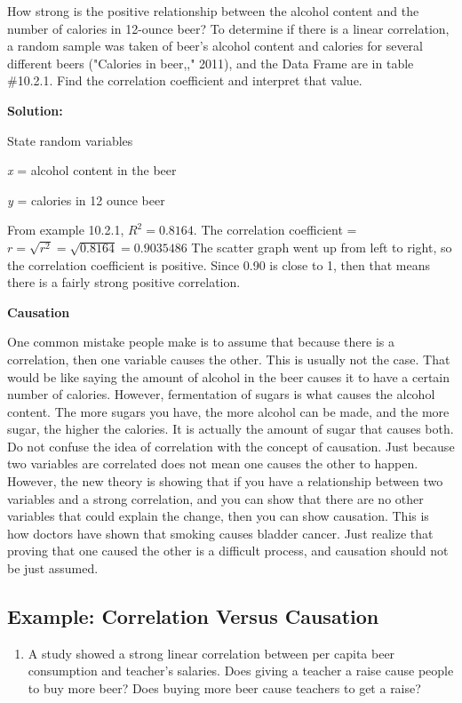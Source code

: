 \documentclass[]{book}
\providecommand{\tightlist}{%
  \setlength{\itemsep}{0pt}\setlength{\parskip}{0pt}}
\begin{document}
How strong is the positive relationship between the alcohol content and the number of calories in 12-ounce beer? To determine if there is a linear correlation, a random sample was taken of beer's alcohol content and calories for several different beers ("Calories in beer,," 2011), and the Data Frame are in table \#10.2.1. Find the correlation coefficient and interpret that value.

\textbf{Solution:}

State random variables

\emph{x} = alcohol content in the beer

\emph{y} = calories in 12 ounce beer

From example 10.2.1, \(R^2=0.8164\). The correlation coefficient = \(r=\sqrt{r^2}=\sqrt{0.8164}=0.9035486\) The scatter graph went up from left to right, so the correlation coefficient is positive. Since 0.90 is close to 1, then that means there is a fairly strong positive correlation.

\textbf{Causation}

One common mistake people make is to assume that because there is a correlation, then one variable causes the other. This is usually not the case. That would be like saying the amount of alcohol in the beer causes it to have a certain number of calories. However, fermentation of sugars is what causes the alcohol content. The more sugars you have, the more alcohol can be made, and the more sugar, the higher the calories. It is actually the amount of sugar that causes both. Do not confuse the idea of correlation with the concept of causation. Just because two variables are correlated does not mean one causes the other to happen. However, the new theory is showing that if you have a relationship between two variables and a strong correlation, and you can show that there are no other variables that could explain the change, then you can show causation. This is how doctors have shown that smoking causes bladder cancer. Just realize that proving that one caused the other is a difficult process, and causation should not be just assumed.

\hypertarget{example-correlation-versus-causation}{%
\subsection{Example: Correlation Versus Causation}\label{example-correlation-versus-causation}}

\begin{enumerate}
\def\labelenumi{\alph{enumi}.}
\tightlist
\item
  A study showed a strong linear correlation between per capita beer consumption and teacher's salaries. Does giving a teacher a raise cause people to buy more beer? Does buying more beer cause teachers to get a raise?
\end{enumerate}
\end{document}
